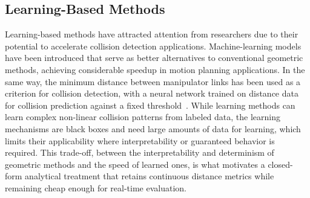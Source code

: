 \begin{table}[htbp]
\centering
\caption{Collision detection and distance computation methods, classified by the form of output they
provide to a controller.}
\label{tab:lit_collision}
\end{table}

\subsection{Learning-Based Methods}\label{subsec:lit_learned_collision}

Learning-based methods have attracted attention from researchers due to their potential to
accelerate collision detection applications. Machine-learning models have been introduced that serve
as better alternatives to conventional geometric methods, achieving considerable speedup in motion
planning applications. In the same way, the minimum distance between manipulator links has been used
as a criterion for collision detection, with a neural network trained on distance data for collision
prediction against a fixed threshold~\citep{das2020learning}. While learning methods can learn complex non-linear collision patterns from labeled data, the learning mechanisms are black boxes and need large amounts of data for learning, which limits their applicability where interpretability or guaranteed behavior is required. This trade-off, between the interpretability and determinism of geometric methods and the speed of learned ones, is what motivates a closed-form analytical treatment that retains continuous distance metrics while remaining cheap enough for real-time evaluation.

